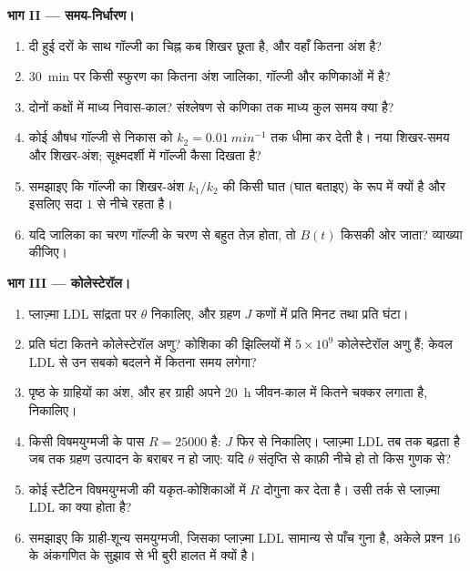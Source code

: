 \begin{problem}
\medskip
\noindent\textbf{भाग II --- समय-निर्धारण।}
\begin{enumerate}[resume]
  \item दी हुई दरों के साथ गॉल्जी का चिह्न कब शिखर छूता है, और वहाँ
        कितना अंश है?
  \item \qty{30}{min} पर किसी स्फुरण का कितना अंश जालिका, गॉल्जी और
        कणिकाओं में है?
  \item दोनों कक्षों में माध्य निवास-काल? संश्लेषण से कणिका तक माध्य
        कुल समय क्या है?
  \item कोई औषध गॉल्जी से निकास को $k_{2} = \qty{0.01}{min^{-1}}$ तक
        धीमा कर देती है। नया शिखर-समय और शिखर-अंश; सूक्ष्मदर्शी में
        गॉल्जी कैसा दिखता है?
  \item समझाइए कि गॉल्जी का शिखर-अंश $k_{1}/k_{2}$ की किसी घात
        (घात बताइए) के रूप में क्यों है और इसलिए सदा $1$ से नीचे रहता है।
  \item यदि जालिका का चरण गॉल्जी के चरण से बहुत तेज़ होता, तो $B(t)$
        किसकी ओर जाता? व्याख्या कीजिए।
\end{enumerate}

\medskip
\noindent\textbf{भाग III --- कोलेस्टेरॉल।}
\begin{enumerate}[resume]
  \item प्लाज़्मा LDL सांद्रता पर $\theta$ निकालिए, और ग्रहण
        $J$ कणों में प्रति मिनट तथा प्रति घंटा।
  \item प्रति घंटा कितने कोलेस्टेरॉल अणु? कोशिका की झिल्लियों में
        $5\times 10^{9}$ कोलेस्टेरॉल अणु हैं; केवल LDL से उन सबको
        बदलने में कितना समय लगेगा?
  \item पृष्ठ के ग्राहियों का अंश, और हर ग्राही अपने \qty{20}{h}
        जीवन-काल में कितने चक्कर लगाता है, निकालिए।
  \item किसी विषमयुग्मजी के पास $R = \num{25000}$ है: $J$ फिर से
        निकालिए। प्लाज़्मा LDL तब तक बढ़ता है जब तक ग्रहण उत्पादन के
        बराबर न हो जाए: यदि $\theta$ संतृप्ति से काफ़ी नीचे हो तो किस
        गुणक से?
  \item कोई स्टैटिन विषमयुग्मजी की यकृत-कोशिकाओं में $R$ दोगुना कर
        देता है। उसी तर्क से प्लाज़्मा LDL का क्या होता है?
  \item समझाइए कि ग्राही-शून्य समयुग्मजी, जिसका प्लाज़्मा LDL सामान्य
        से पाँच गुना है, अकेले प्रश्न 16 के अंकगणित के सुझाव से भी
        बुरी हालत में क्यों है।
\end{enumerate}


\end{problem}
